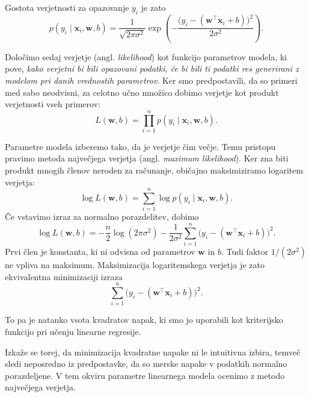 Gostota verjetnosti za opazovanje \(y_i\) je zato
%
\[
p(y_i \mid \mathbf{x}_i, \mathbf{w}, b)
=
\frac{1}{\sqrt{2\pi\sigma^2}}
\exp\left(
-\frac{\bigl(y_i - (\mathbf{w}^\top \mathbf{x}_i + b)\bigr)^2}{2\sigma^2}
\right).
\]
%

Določimo sedaj verjetje (angl. \emph{likelihood}) kot funkcijo parametrov modela, ki pove, {\em kako verjetni bi bili opazovani podatki, če bi bili ti podatki res generirani z modelom pri danih vrednostih parametrov}. Ker smo predpostavili, da so primeri med sabo neodvisni, za celotno učno množico dobimo verjetje kot produkt verjetnosti vseh primerov:
%
\[
L(\mathbf{w}, b)
=
\prod_{i=1}^{n}
p(y_i \mid \mathbf{x}_i, \mathbf{w}, b).
\]

Parametre modela izberemo tako, da je verjetje čim večje. Temu pristopu pravimo metoda največjega verjetja (angl. \emph{maximum likelihood}). Ker zna biti produkt mnogih členov neroden za računanje, običajno maksimiziramo logaritem verjetja:
%
\[
\log L(\mathbf{w}, b)
=
\sum_{i=1}^{n}
\log p(y_i \mid \mathbf{x}_i, \mathbf{w}, b).
\]
%
Če vstavimo izraz za normalno porazdelitev, dobimo
%
\[
\log L(\mathbf{w}, b)
=
-\frac{n}{2}\log(2\pi\sigma^2)
-
\frac{1}{2\sigma^2}
\sum_{i=1}^{n}
\bigl(y_i - (\mathbf{w}^\top \mathbf{x}_i + b)\bigr)^2 .
\]
%
Prvi člen je konstanta, ki ni odvisna od parametrov \(\mathbf{w}\) in \(b\).  
Tudi faktor \(1/(2\sigma^2)\) ne vpliva na maksimum. Maksimizacija logaritemskega verjetja je zato ekvivalentna minimizaciji izraza
%
\[
\sum_{i=1}^{n}
\bigl(y_i - (\mathbf{w}^\top \mathbf{x}_i + b)\bigr)^2 .
\]

To pa je natanko vsota kvadratov napak, ki smo jo uporabili kot kriterijsko funkcijo pri učenju linearne regresije.

Izkaže se torej, da minimizacija kvadratne napake ni le intuitivna izbira, temveč sledi neposredno iz predpostavke, da so merske napake v podatkih normalno porazdeljene. V tem okviru parametre linearnega modela ocenimo z metodo največjega verjetja.

